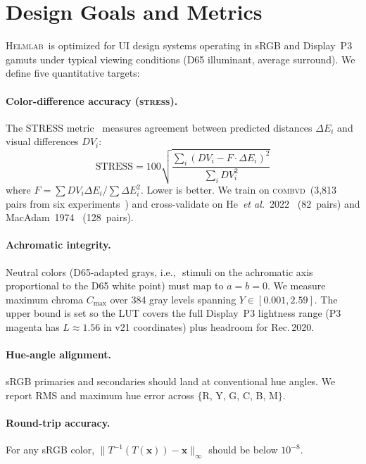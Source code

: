 \documentclass[11pt, twocolumn]{article}
\newcommand{\helmlab}{\textsc{Helmlab}}
\newcommand{\stress}{\textsc{stress}}
\newcommand{\combvd}{\textsc{combvd}}
\newcommand{\ie}{i.e.,\,}
\newcommand{\etal}{\textit{et al.}}
\begin{document}
\section{Design Goals and Metrics}
\label{sec:goals}

\helmlab\ is optimized for UI design systems operating in sRGB and
Display~P3 gamuts under typical viewing conditions (D65 illuminant,
average surround). We define five quantitative targets:

\paragraph{Color-difference accuracy (\stress).}
The STRESS metric~\cite{luo2006} measures agreement between predicted
distances $\Delta E_i$ and visual differences $DV_i$:
\begin{equation}
  \mathrm{STRESS} = 100\sqrt{\frac{\sum_i(DV_i - F \cdot \Delta E_i)^2}{\sum_i DV_i^2}}
  \label{eq:stress}
\end{equation}
where $F = \sum DV_i \Delta E_i / \sum \Delta E_i^2$. Lower is better.
We train on \combvd\ (3{,}813 pairs from six experiments~\cite{luo2006})
and cross-validate on He~\etal\ 2022~\cite{he2022} (82~pairs) and
MacAdam~1974~\cite{macadam1974} (128~pairs).

\paragraph{Achromatic integrity.}
Neutral colors (D65-adapted grays, \ie\ stimuli on the achromatic axis
proportional to the D65 white point) must map to $a = b = 0$. We
measure maximum chroma $C_{\max}$ over 384 gray levels spanning
$Y \in [0.001, 2.59]$. The upper bound is set so the LUT covers
the full Display~P3 lightness range (P3 magenta has $L\!\approx\!1.56$
in v21 coordinates) plus headroom for Rec.\,2020.

\paragraph{Hue-angle alignment.}
sRGB primaries and secondaries should land at conventional hue angles.
We report RMS and maximum hue error across
$\{$R, Y, G, C, B, M$\}$.

\paragraph{Round-trip accuracy.}
For any sRGB color, $\|T^{-1}(T(\mathbf{x})) - \mathbf{x}\|_\infty$
should be below $10^{-8}$.
\end{document}

